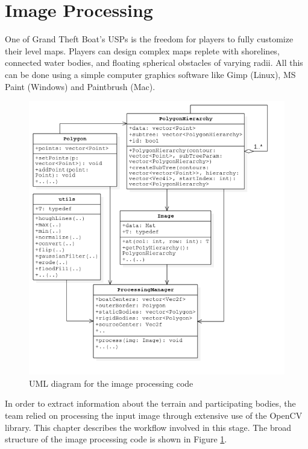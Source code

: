 \section{Image Processing}
\label{sec: imageProcessing}

One of Grand Theft Boat's USPs is the freedom for players to fully customize their level maps. Players can design complex maps replete with shorelines, connected water bodies, and floating spherical obstacles of varying radii. All this can be done using a simple computer graphics software like Gimp (Linux), MS Paint (Windows) and Paintbrush (Mac). 

\begin{figure}
\centering
  \includegraphics[scale=0.6]{img/ImageProcessing/UML_ImgProc_PNG.png}
\caption{UML diagram for the image processing code\label{fig:UMLImgProc}}
\end{figure}

In order to extract information about the terrain and participating bodies, the team relied on processing the input image through extensive use of the OpenCV library. This chapter describes the workflow involved in this stage. The broad structure of the image processing code is shown in Figure \ref{fig:UMLImgProc}.

